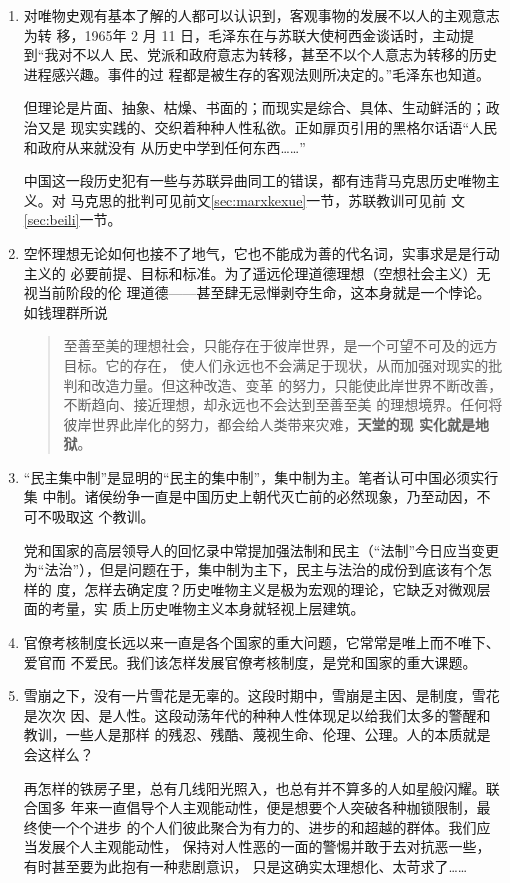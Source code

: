 \begin{enumerate}
\item 对唯物史观有基本了解的人都可以认识到，客观事物的发展不以人的主观意志为转
  移，1965年 2 月 11 日，毛泽东在与苏联大使柯西金谈话时，主动提到“我对不以人
  民、党派和政府意志为转移，甚至不以个人意志为转移的历史进程感兴趣。事件的过
  程都是被生存的客观法则所决定的。”毛泽东也知道。

  但理论是片面、抽象、枯燥、书面的；而现实是综合、具体、生动鲜活的；政治又是
  现实实践的、交织着种种人性私欲。正如扉页引用的黑格尔话语“人民和政府从来就没有
  从历史中学到任何东西……”

  中国这一段历史犯有一些与苏联异曲同工的错误，都有违背马克思历史唯物主义。对
  马克思的批判可见前文\cref{sec:marxkexue}一节，苏联教训可见前
  文\cref{sec:beili}一节。

\item 空怀理想无论如何也接不了地气，它也不能成为善的代名词，实事求是是行动主义的
  必要前提、目标和标准。为了遥远伦理道德理想（空想社会主义）无视当前阶段的伦
  理道德——甚至肆无忌惮剥夺生命，这本身就是一个悖论。如钱理群所说
  \begin{quotation}
    至善至美的理想社会，只能存在于彼岸世界，是一个可望不可及的远方目标。它的存在，
    使人们永远也不会满足于现状，从而加强对现实的批判和改造力量。但这种改造、变革
    的努力，只能使此岸世界不断改善，不断趋向、接近理想，却永远也不会达到至善至美
    的理想境界。任何将彼岸世界此岸化的努力，都会给人类带来灾难，\textbf{天堂的现
      实化就是地狱}。
  \end{quotation}

\item “民主集中制”是显明的“民主的集中制”，集中制为主。笔者认可中国必须实行集
  中制。诸侯纷争一直是中国历史上朝代灭亡前的必然现象，乃至动因，不可不吸取这
  个教训。

  党和国家的高层领导人的回忆录中常提加强法制和民主（“法制”今日应当变更
  为“法治”），但是问题在于，集中制为主下，民主与法治的成份到底该有个怎样的
  度，怎样去确定度？历史唯物主义是极为宏观的理论，它缺乏对微观层面的考量，实
  质上历史唯物主义本身就轻视上层建筑。

\item 官僚考核制度长远以来一直是各个国家的重大问题，它常常是唯上而不唯下、爱官而
  不爱民。我们该怎样发展官僚考核制度，是党和国家的重大课题。

\item 雪崩之下，没有一片雪花是无辜的。这段时期中，雪崩是主因、是制度，雪花是次次
  因、是人性。这段动荡年代的种种人性体现足以给我们太多的警醒和教训，一些人是那样
  的残忍、残酷、蔑视生命、伦理、公理。人的本质就是会这样么？

  再怎样的铁房子里，总有几线阳光照入，也总有并不算多的人如星般闪耀。联合国多
  年来一直倡导个人主观能动性，便是想要个人突破各种枷锁限制，最终使一个个进步
  的个人们彼此聚合为有力的、进步的和超越的群体。我们应当发展个人主观能动性，
  保持对人性恶的一面的警惕并敢于去对抗恶一些，有时甚至要为此抱有一种悲剧意识，
  只是这确实太理想化、太苛求了……
\end{enumerate}

